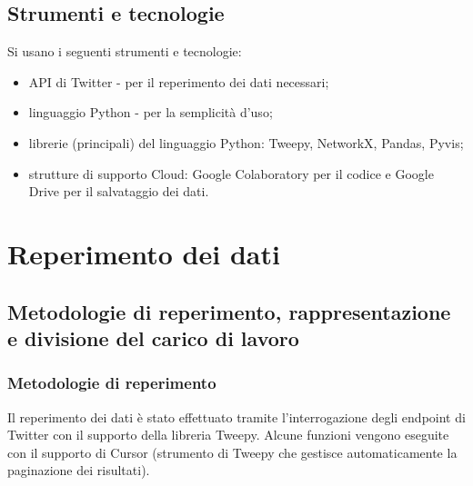 \documentclass[a4paper, 12pt, twoside]{article}
\begin{document}
\subsection{Strumenti e tecnologie}
Si usano i seguenti strumenti e tecnologie:
\begin{itemize}
    \item API di Twitter - per il reperimento dei dati necessari;
    \item linguaggio Python - per la semplicità d’uso;
    \item librerie (principali) del linguaggio Python: Tweepy, NetworkX, Pandas, Pyvis;
    \item strutture di supporto Cloud: Google Colaboratory per il codice e Google Drive per il salvataggio dei dati.
\end{itemize}

\section{Reperimento dei dati} \label{sec:reperimento_dati}


\subsection{Metodologie di reperimento, rappresentazione e divisione del carico di lavoro}

\subsubsection{Metodologie di reperimento}
Il reperimento dei dati è stato effettuato tramite l’interrogazione degli endpoint di Twitter con il supporto della libreria Tweepy. Alcune funzioni vengono eseguite con il supporto di Cursor (strumento di Tweepy che gestisce automaticamente la paginazione dei risultati).
\end{document}
